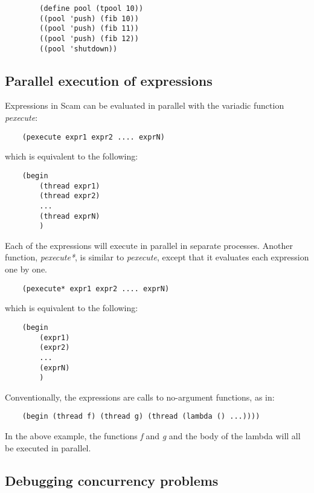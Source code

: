     \begin{verbatim}
        (define pool (tpool 10))
        ((pool 'push) (fib 10))
        ((pool 'push) (fib 11))
        ((pool 'push) (fib 12))
        ((pool 'shutdown))
    \end{verbatim} 

\subsection{Parallel execution of expressions}

Expressions in Scam can be evaluated in parallel with the variadic function
{\it pexecute}:

\begin{verbatim}
    (pexecute expr1 expr2 .... exprN)
\end{verbatim}

which is equivalent to the following:

\begin{verbatim}
    (begin
        (thread expr1)
        (thread expr2)
        ...
        (thread exprN)
        )
\end{verbatim}

Each of the expressions will execute in parallel in separate processes.
Another function, {\it pexecute*}, is similar to {\it pexecute}, except that it evaluates each expression one by one.

\begin{verbatim}
    (pexecute* expr1 expr2 .... exprN)
\end{verbatim}

which is equivalent to the following:

\begin{verbatim}
    (begin
        (expr1)
        (expr2)
        ...
        (exprN)
        )
\end{verbatim}

Conventionally, the expressions are calls to no-argument functions, as in:

\begin{verbatim}
    (begin (thread f) (thread g) (thread (lambda () ...))))
\end{verbatim}

In the above example, the functions {\it f} and {\it g}
and the body of the lambda
will all be executed in parallel.

\subsection{Debugging concurrency problems}

